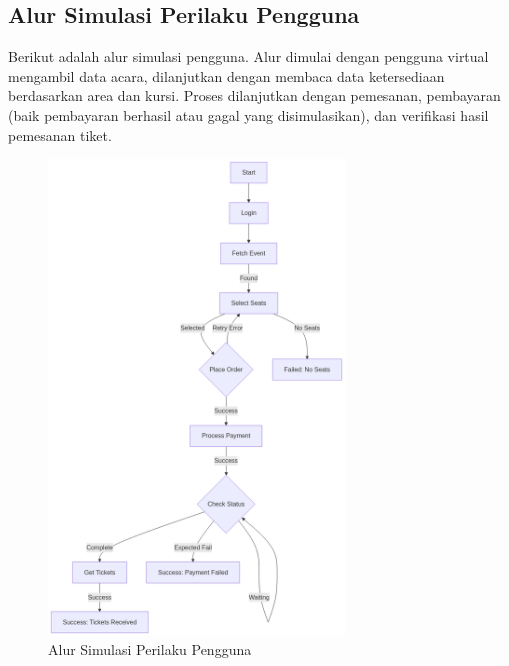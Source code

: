 \subsection{Alur Simulasi Perilaku Pengguna}

Berikut adalah alur simulasi pengguna. Alur dimulai dengan pengguna virtual mengambil data acara, dilanjutkan dengan membaca data ketersediaan berdasarkan area dan kursi. Proses dilanjutkan dengan pemesanan, pembayaran (baik pembayaran berhasil atau gagal yang disimulasikan), dan verifikasi hasil pemesanan tiket.

\begin{figure}[htbp]
    \centering
    \includegraphics[width=0.7\textwidth]{resources/chapter-3/user-flow.png}
    \caption{Alur Simulasi Perilaku Pengguna}
    \label{fig:user-flow}
\end{figure}

\pagebreak